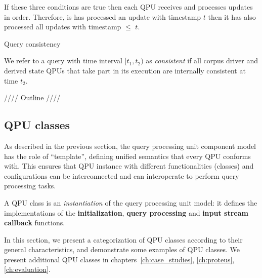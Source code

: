 If these three conditions are true then each QPU receives and processes updates in order.
Therefore, is has processed an update with timestamp $t$ then it has also processed all updates with timestamp $\leq$ $t$.

\medskip
\noindent
Query consistency

\noindent
We refer to a query with time interval $[t_1, t_2)$ as \textit{consistent} if all corpus driver and derived state QPUs
that take part in its execution are internally consistent at time $t_2$.

\noindent
//// Outline ////


\subsection{QPU classes}
\label{sec:qpu_classes}

As described in the previous section, the query processing unit component model has the role of ``template'',
defining unified semantics that every QPU conforms with.
This ensures that QPU instance with different functionalities (classes) and configurations can be interconnected and
can interoperate to perform query processing tasks.

A QPU class is an \textit{instantiation} of the query processing unit model:
it defines the implementations of the \textbf{initialization}, \textbf{query processing} and \textbf{input stream callback}
functions.

In this section, we present a categorization of QPU classes according to their general characteristics,
and demonstrate some examples of QPU classes.
We present additional QPU classes in chapters~\ref{ch:case_studies}, \ref{ch:proteus}, \ref{ch:evaluation}.

